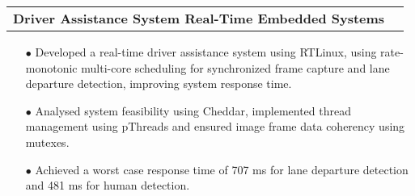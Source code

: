 \documentclass[11pt]{article}
\makeatletter
\newcommand{\resumeSubheadingP}[2]{
  \vspace{-2pt}\item
    \begin{tabular*}{1.0\textwidth}[t]{l@{\extracolsep{\fill}}r}
       \textbf{{\large #1}}&{#2} \\
    \end{tabular*}\vspace{-1pt}
}
\makeatother
\begin{document}
\resumeSubheadingP
{Driver Assistance System \textbar{ } Real-Time Embedded Systems }{}
\begin{itemize}[leftmargin=0.3in]\setlength{\itemsep}{0pt}\setlength{\parskip}{0pt}\vspace{-0.2cm}
  \item[$\bullet$] Developed a real-time driver assistance system using RTLinux, using rate-monotonic multi-core scheduling for synchronized frame capture and lane departure detection, improving system response time.
  \item[$\bullet$] Analysed system feasibility using Cheddar, implemented thread management using pThreads and ensured image frame data coherency using mutexes. 
  \item[$\bullet$] Achieved a worst case response time of 707 ms for lane departure detection and 481 ms for human detection. 
\end{itemize}
\vspace{-0.2cm}
%


\end{document}
